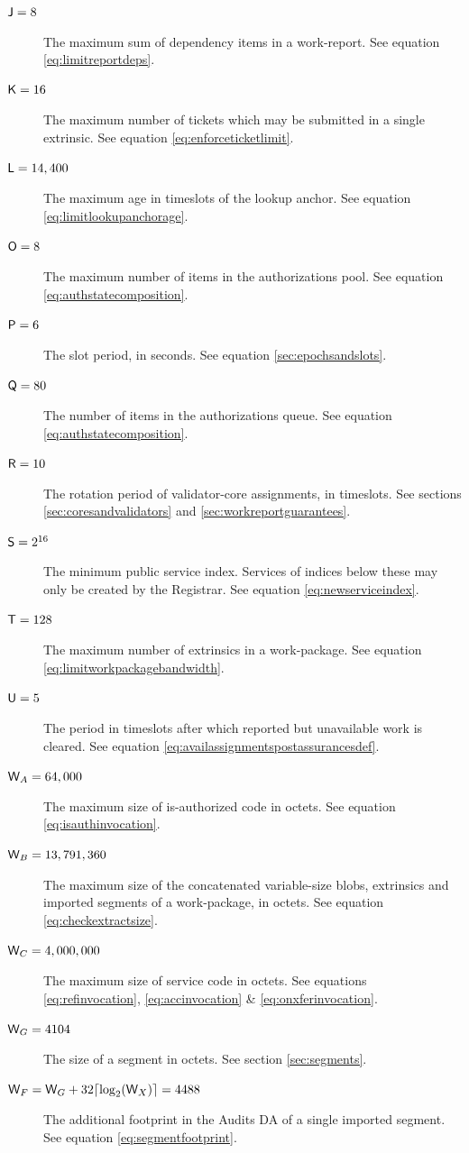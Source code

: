 \begin{description}
  \item[$\mathsf{J} = 8$] The maximum sum of dependency items in a work-report. See equation \ref{eq:limitreportdeps}.
  \item[$\mathsf{K} = 16$] The maximum number of tickets which may be submitted in a single extrinsic. See equation \ref{eq:enforceticketlimit}.
  \item[$\mathsf{L} = 14,400$] The maximum age in timeslots of the lookup anchor. See equation \ref{eq:limitlookupanchorage}.
  \item[$\mathsf{O} = 8$] The maximum number of items in the authorizations pool. See equation \ref{eq:authstatecomposition}.
  \item[$\mathsf{P} = 6$] The slot period, in seconds. See equation \ref{sec:epochsandslots}.
  \item[$\mathsf{Q} = 80$] The number of items in the authorizations queue. See equation \ref{eq:authstatecomposition}.
  \item[$\mathsf{R} = 10$] The rotation period of validator-core assignments, in timeslots. See sections \ref{sec:coresandvalidators} and \ref{sec:workreportguarantees}.
  \item[$\mathsf{S} = 2^{16}$] The minimum public service index. Services of indices below these may only be created by the Registrar. See equation \ref{eq:newserviceindex}.
  \item[$\mathsf{T} = 128$] The maximum number of extrinsics in a work-package. See equation \ref{eq:limitworkpackagebandwidth}.
  \item[$\mathsf{U} = 5$] The period in timeslots after which reported but unavailable work is cleared. See equation \ref{eq:availassignmentspostassurancesdef}.
  \item[$\mathsf{W}_A = 64,000$] The maximum size of is-authorized code in octets. See equation \ref{eq:isauthinvocation}.
  \item[$\mathsf{W}_B = 13,791,360$] The maximum size of the concatenated variable-size blobs, extrinsics and imported segments of a work-package, in octets. See equation \ref{eq:checkextractsize}.
  \item[$\mathsf{W}_C = 4,000,000$] The maximum size of service code in octets. See equations \ref{eq:refinvocation}, \ref{eq:accinvocation} \& \ref{eq:onxferinvocation}.
  \item[$\mathsf{W}_G = 4104$] The size of a segment in octets. See section \ref{sec:segments}.
  \item[$\Csegmentfootprint = \Csegmentsize + 32\ceil{\log_2(\Cmaxpackageexports)} = 4488$] The additional footprint in the Audits DA of a single imported segment. See equation \ref{eq:segmentfootprint}.

\end{description}
